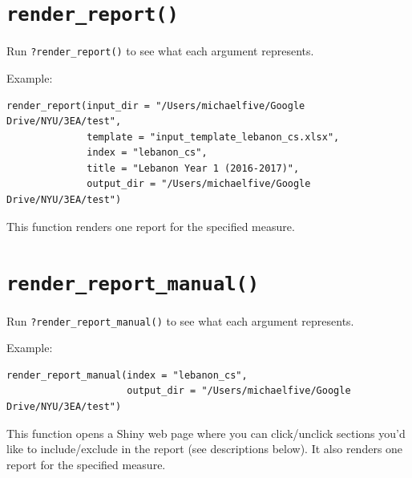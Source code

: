 \documentclass[
]{book}
\begin{document}
\hypertarget{render_report}{%
\section{\texorpdfstring{\texttt{render\_report()}}{render\_report()}}\label{render_report}}

Run \texttt{?render\_report()} to see what each argument represents.

Example:

\begin{verbatim}
render_report(input_dir = "/Users/michaelfive/Google Drive/NYU/3EA/test",
              template = "input_template_lebanon_cs.xlsx",
              index = "lebanon_cs",
              title = "Lebanon Year 1 (2016-2017)",
              output_dir = "/Users/michaelfive/Google Drive/NYU/3EA/test")
\end{verbatim}

This function renders one report for the specified measure.

\hypertarget{render_report_manual}{%
\section{\texorpdfstring{\texttt{render\_report\_manual()}}{render\_report\_manual()}}\label{render_report_manual}}

Run \texttt{?render\_report\_manual()} to see what each argument represents.

Example:

\begin{verbatim}
render_report_manual(index = "lebanon_cs",
                     output_dir = "/Users/michaelfive/Google Drive/NYU/3EA/test")
\end{verbatim}

This function opens a Shiny web page where you can click/unclick sections you'd like to include/exclude in the report (see descriptions below). It also renders one report for the specified measure.
\end{document}
